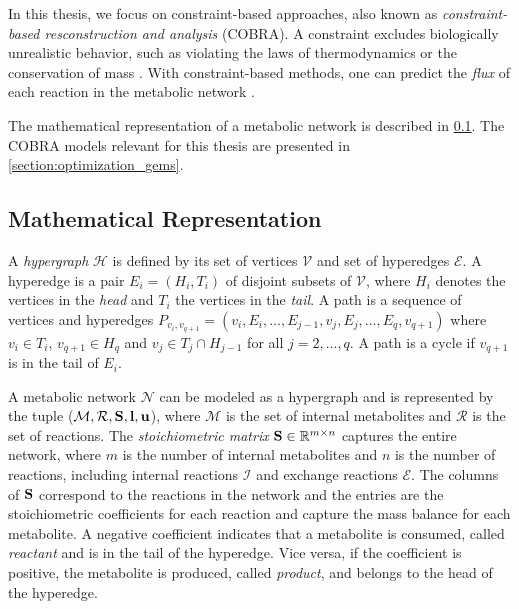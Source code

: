 In this thesis, we focus on constraint-based approaches, also known as \textit{constraint-based resconstruction and analysis} (COBRA). A constraint excludes biologically unrealistic behavior, such as violating the laws of thermodynamics or the conservation of mass \cite{intro_computational_systems_biology}.
With constraint-based methods, one can predict the 
\textit{flux} of each reaction in the metabolic network \cite{intro_computational_systems_biology}.


The mathematical representation of a metabolic network is described in \cref{section:mathematical_representation}.
The COBRA models relevant for this thesis are presented in \cref{section:optimization_gems}.

\subsection{Mathematical Representation} \label{section:mathematical_representation}
A \textit{hypergraph} $\mathscr{H}$ is defined by its set of vertices $\mathscr{V}$ and set of hyperedges $\mathscr{E}$. A hyperedge is a pair $E_i= (H_i,T_i)$ of disjoint subsets of $\mathscr{V}$, where $H_i$ denotes the vertices in the \textit{head} and $T_i$ the vertices in the \textit{tail}. A path is a sequence of vertices and hyperedges $P_{v_i,v_{q+1}} = (v_i, E_i, ..., E_{j-1}, v_j, E_{j}, ..., E_q, v_{q+1})$ where $v_i \in T_i$, $v_{q+1} \in H_q$ and $v_j \in T_j \cap H_{j-1}$ for all $j = 2,...,q$. A path is a cycle if $v_{q+1}$ is in the tail of $E_i$. \cite{gallo_directed_1993} %

A metabolic network $\mathcal{N}$ can be modeled as a hypergraph and is represented by the tuple ($\mathcal{M}, \mathcal{R}, \bold S, \bold l, \bold u$), where $\mathcal M$ is the set of internal metabolites and $\mathcal{R}$ is the set of reactions. The \textit{stoichiometric matrix} $\bold S \in \mathbb{R}^{m\times n}$ captures the entire network, where $m$ is the number of internal metabolites and $n$ is the number of reactions, including internal reactions $\mathcal{I}$ and exchange reactions $\mathcal{E}$. 
The columns of $\bold S$ correspond to the reactions in the network and the entries are the stoichiometric coefficients for each reaction and capture the mass balance for each metabolite. A negative coefficient indicates that a metabolite is consumed, called \textit{reactant} and is in the tail of the hyperedge. Vice versa, if the coefficient is positive, the metabolite is produced, called \textit{product}, and belongs to the head of the hyperedge.


